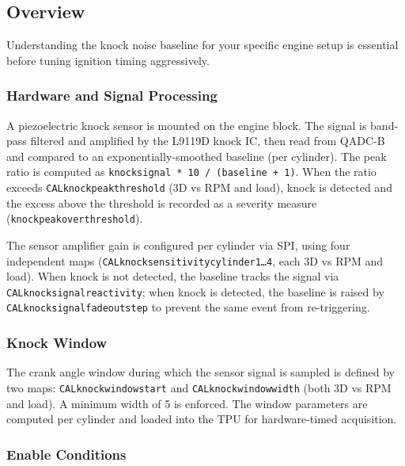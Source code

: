 \documentclass[a4paper,11pt]{article}
\renewcommand{\_}{\oldunderscore\allowbreak}
\begin{document}
\subsection{Overview}

Understanding the knock noise baseline for your specific engine setup is
essential before tuning ignition timing aggressively.

\subsubsection*{Hardware and Signal Processing}

A piezoelectric knock sensor is mounted on the engine block. The signal is
band-pass filtered and amplified by the L9119D knock IC, then read from
QADC-B and compared to an exponentially-smoothed baseline (per cylinder). The
peak ratio is computed as \texttt{knock\_signal * 10 / (baseline + 1)}.
When the ratio exceeds \texttt{CAL\_knock\_peak\_threshold} (3D vs RPM
and load), knock is detected and the excess above the threshold is recorded
as a severity measure (\texttt{knock\_peak\_over\_threshold}).

The sensor amplifier gain is configured per cylinder via SPI, using four
independent maps (\texttt{CAL\_knock\_sensitivity\_cylinder1\ldots4},
each 3D vs RPM and load). When knock is not detected, the baseline
tracks the signal via \texttt{CAL\_knock\_signal\_reactivity}; when knock is
detected, the baseline is raised by \texttt{CAL\_knock\_signal\_fadeout\_step}
to prevent the same event from re-triggering.

\subsubsection*{Knock Window}

The crank angle window during which the sensor signal is sampled is defined by
two maps: \texttt{CAL\_knock\_window\_start} and
\texttt{CAL\_knock\_window\_width} (both 3D vs RPM and load). A
minimum width of 5\textdegree{} is enforced. The window parameters are computed
per cylinder and loaded into the TPU for hardware-timed acquisition.

\subsubsection*{Enable Conditions}
\end{document}

